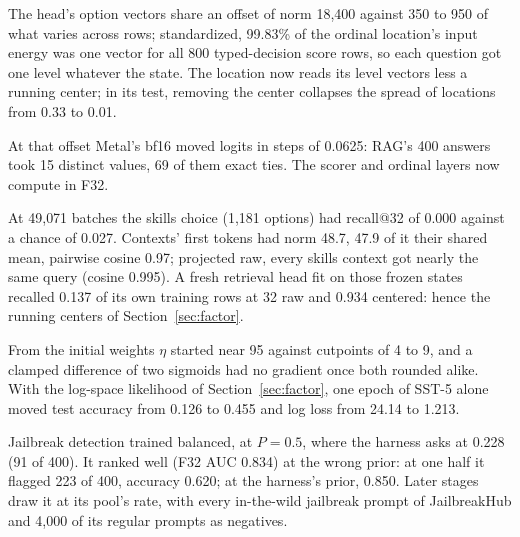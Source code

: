 \begin{description}[leftmargin=1.5em,style=nextline]
  \item[A shared offset decided every score question alike.] The head's option
    vectors share an offset of norm 18{,}400 against 350 to 950 of what varies
    across rows; standardized, 99.83\% of the ordinal location's input energy
    was one vector for all 800 typed-decision score rows, so each question got
    one level whatever the state. The location now reads its level vectors less
    a running center; in its test, removing the center collapses the spread of
    locations from 0.33 to 0.01.
  \item[bf16 rounded the decision away.] At that offset Metal's bf16 moved
     logits in steps of 0.0625: RAG's 400 answers took 15 distinct
    values, 69 of them exact ties. The scorer and ordinal layers now compute in
    F32.
  \item[Retrieval gave every context one query.] At 49{,}071 batches the skills
    choice (1{,}181 options) had recall@32 of 0.000 against a chance of 0.027.
    Contexts' first tokens had norm 48.7, 47.9 of it their shared mean, pairwise
    cosine 0.97; projected raw, every skills context got nearly the same query
    (cosine 0.995). A fresh retrieval head fit on those frozen states recalled
    0.137 of its own training rows at 32 raw and 0.934 centered: hence the
    running centers of Section~\ref{sec:factor}.
  \item[The ordinal head had no gradient.] From the initial weights $\eta$
    started near 95 against cutpoints of 4 to 9, and a clamped difference of two
    sigmoids had no gradient once both rounded alike. With the log-space
    likelihood of Section~\ref{sec:factor}, one epoch of SST-5 alone moved test
    accuracy from 0.126 to 0.455 and log loss from 24.14 to 1.213.
  \item[A balanced class taught the wrong prior.] Jailbreak detection trained
    balanced, at $P = 0.5$, where the harness asks at 0.228 (91 of 400). It
    ranked well (F32 AUC 0.834) at the wrong prior: at one half it flagged 223
    of 400, accuracy 0.620; at the harness's prior, 0.850. Later stages draw it
    at its pool's rate, with every in-the-wild jailbreak prompt of JailbreakHub
    and 4{,}000 of its regular prompts as negatives.
\end{description}
